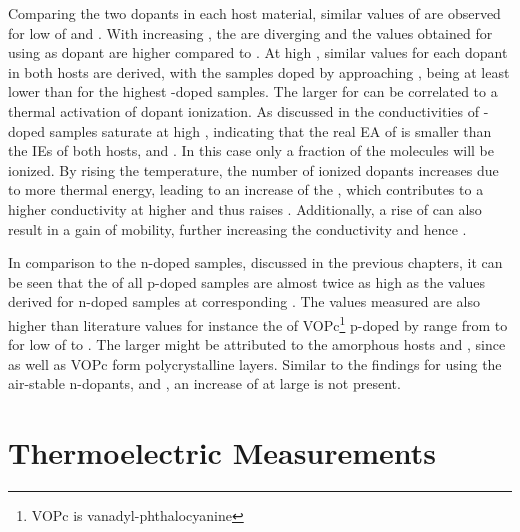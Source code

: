 Comparing the two dopants in each host material, similar values of \Eact are observed for low \CLongs of \FS and \CSF. With increasing \CLongs, the \Eact are diverging and the values obtained for using \CSF as dopant are higher compared to \FS.
At high \C, similar values for each dopant in both hosts are derived, with the samples doped by \FS approaching \Eact[200], being at least  lower than for the highest \CSF-doped samples.
The larger \Eact for \CSF can be correlated to a thermal activation of dopant ionization. As discussed in  the conductivities of \CSF-doped samples saturate at high \C, indicating that the real EA of \CSF is smaller than the IEs of both hosts, \meo and \lili. In this case only a fraction of the \CSF molecules will be ionized. By rising the temperature, the number of ionized dopants increases due to more thermal energy, leading to an increase of the \nhLong \nh, which contributes to a higher conductivity at higher \T and thus raises \Eact. Additionally, a rise of \nh can also result in a gain of mobility\cite{Arkhipov2005,Arkhipov2005a}, further increasing the conductivity and hence \Eact.

In comparison to the n-doped \CS samples, discussed in the previous chapters, it can be seen that the \Eact of all p-doped samples are almost twice as high as the values derived for n-doped \CS samples at corresponding \CLongs. The values measured are also higher than literature values for instance the \Eact of VOPc\footnote{VOPc is vanadyl-phthalocyanine} p-doped by \FV range from  to  for low \CLongs of \C[0.002] to \cite{Pfeiffer1998}. The larger \Eact might be attributed to the amorphous hosts \meo and \lili, since \CS as well as VOPc form polycrystalline layers.
Similar to the findings for \CS using the air-stable n-dopants, \aob and \dmbi, an increase of \Eact at large \CLongs is not present.

\section{Thermoelectric Measurements}%
\label{sec:ResP-S}
